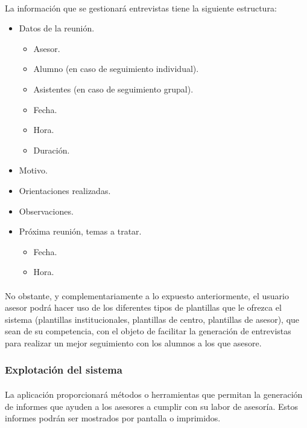      \paragraph{}La información que se gestionará entrevistas tiene la
      siguiente estructura:

      \begin{itemize}
         \item Datos de la reunión.
         \begin{itemize}
            \item Asesor.
            \item Alumno (en caso de seguimiento individual).
            \item Asistentes (en caso de seguimiento grupal).
            \item Fecha.
            \item Hora.
            \item Duración.
         \end{itemize}
         \item Motivo.
         \item Orientaciones realizadas.
         \item Observaciones.
         \item Próxima reunión, temas a tratar.
         \begin{itemize}
            \item Fecha.
            \item Hora.
         \end{itemize}
      \end{itemize}

      \paragraph{}No obstante, y complementariamente a lo expuesto
      anteriormente, el usuario asesor podrá hacer uso de los diferentes tipos
      de plantillas que le ofrezca el sistema (plantillas institucionales,
      plantillas de centro, plantillas de asesor), que sean de su competencia,
      con el objeto de facilitar la generación de entrevistas para realizar un
      mejor seguimiento con los alumnos a los que asesore.

      \subsubsection{Explotación del sistema}

      \paragraph{}La aplicación proporcionará métodos o herramientas que
      permitan la generación de informes que ayuden a los asesores a cumplir con
      su labor de asesoría. Estos informes podrán ser mostrados por pantalla o
      imprimidos.

